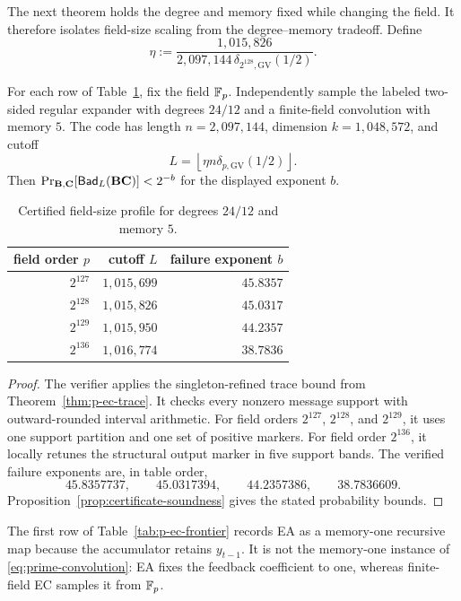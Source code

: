 The next theorem holds the degree and memory fixed while changing the field.
It therefore isolates field-size scaling from the degree--memory tradeoff.
Define
\[
 \eta:=\frac{1{,}015{,}826}
 {2{,}097{,}144\,\delta_{2^{128},\mathrm{GV}}(1/2)}.
\]

\begin{theorem}
\label{thm:field-size-ec-certificates}
For each row of Table~\ref{tab:field-size-ec-certificates}, fix the field
$\mathbb F_p$.  Independently sample the labeled two-sided regular expander with
degrees $24/12$ and a finite-field convolution with memory $5$.  The code has
length $n=2{,}097{,}144$, dimension $k=1{,}048{,}572$, and cutoff
\[
 L=\left\lfloor \eta n\delta_{p,\mathrm{GV}}(1/2)\right\rfloor.
\]
Then $\Pr_{\mathbf B,\mathbf C}[\mathsf{Bad}_L(\mathbf B\mathbf C)]<2^{-b}$ for the displayed exponent $b$.
\end{theorem}

\begin{table}[ht]
\centering
\caption{Certified field-size profile for degrees $24/12$ and memory $5$.}
\label{tab:field-size-ec-certificates}
\begin{tabular}{@{}rrr@{}}
\toprule
field order $p$ & cutoff $L$ & failure exponent $b$ \\
\midrule
$2^{127}$ & $1{,}015{,}699$ & $45.8357$ \\
$2^{128}$ & $1{,}015{,}826$ & $45.0317$ \\
$2^{129}$ & $1{,}015{,}950$ & $44.2357$ \\
$2^{136}$ & $1{,}016{,}774$ & $38.7836$ \\
\bottomrule
\end{tabular}
\end{table}

\begin{proof}
The verifier applies the singleton-refined trace bound from
Theorem~\ref{thm:p-ec-trace}.  It checks every nonzero message support with
outward-rounded interval arithmetic.  For field orders $2^{127}$,
$2^{128}$, and $2^{129}$, it uses one support partition and one set of
positive markers.  For field order $2^{136}$, it locally retunes the
structural output marker in five support bands.  The verified failure
exponents are, in table order,
\[
 45.8357737,\qquad 45.0317394,\qquad
 44.2357386,\qquad 38.7836609.
\]
Proposition~\ref{prop:certificate-soundness} gives the stated probability
bounds.
\end{proof}

The first row of Table~\ref{tab:p-ec-frontier} records EA as a memory-one
recursive map because the accumulator retains $y_{t-1}$.  It is not the
memory-one instance of \eqref{eq:prime-convolution}: EA fixes the feedback
coefficient to one, whereas finite-field EC samples it from $\mathbb F_p$.

